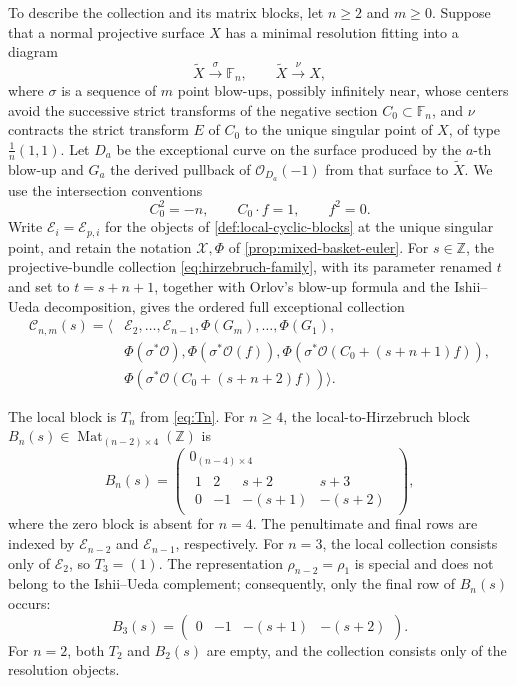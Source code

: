 \documentclass[11pt]{article}
\theoremstyle{plain}
\theoremstyle{definition}
\theoremstyle{remark}
\newcommand{\F}{\mathbb F}
\newcommand{\Z}{\mathbb Z}
\newcommand{\XX}{\mathcal X}
\newcommand{\OO}{\mathcal O}
\begin{document}
To describe the collection and its matrix blocks, let \(n\geq2\) and
\(m\geq0\). Suppose that a normal projective surface \(X\) has
a minimal resolution fitting into a diagram
\[
\widetilde X\xrightarrow{\ \sigma\ }\F_n,
\qquad
\widetilde X\xrightarrow{\ \nu\ }X,
\]
where \(\sigma\) is a sequence of \(m\) point blow-ups, possibly
infinitely near, whose centers avoid the successive strict transforms
of the negative section \(C_0\subset\F_n\), and \(\nu\)
contracts the strict transform \(E\) of \(C_0\) to the unique singular point
of \(X\), of type \(\frac1n(1,1)\). Let \(D_a\) be the exceptional
curve on the surface produced by the \(a\)-th blow-up and \(G_a\) the derived
pullback of \(\OO_{D_a}(-1)\) from that surface to \(\widetilde X\). We use the
intersection conventions
\[
C_0^2=-n,
\qquad
C_0\cdot f=1,
\qquad
f^2=0.
\]
Write \(\mathcal E_i=\mathcal E_{p,i}\) for the objects of
\cref{def:local-cyclic-blocks} at the unique singular point, and
retain the notation \(\XX,\Phi\) of \cref{prop:mixed-basket-euler}.
For \(s\in\Z\), the projective-bundle collection
\eqref{eq:hirzebruch-family}, with its parameter renamed \(t\) and set to
\(t=s+n+1\), together with Orlov's blow-up formula and the Ishii--Ueda
decomposition, gives the ordered full exceptional collection
\[
\begin{aligned}
\mathcal C_{n,m}(s)=\big\langle
&\mathcal E_2,\dots,\mathcal E_{n-1},
\Phi(G_m),\dots,\Phi(G_1),\\
&\Phi(\sigma^*\OO),\Phi(\sigma^*\OO(f)),
\Phi(\sigma^*\OO(C_0+(s+n+1)f)),\\
&\Phi(\sigma^*\OO(C_0+(s+n+2)f))
\big\rangle .
\end{aligned}
\]

The local block is \(T_n\) from \eqref{eq:Tn}.
For \(n\geq4\), the local-to-Hirzebruch block
\(B_n(s)\in\operatorname{Mat}_{(n-2)\times4}(\Z)\) is
\begin{equation}\label{eq:Bn}
B_n(s)
=
\begin{pmatrix}
0_{(n-4)\times4}\\[2pt]
\begin{matrix}
1&2&s+2&s+3\\
0&-1&-(s+1)&-(s+2)
\end{matrix}
\end{pmatrix},
\end{equation}
where the zero block is absent for \(n=4\). The penultimate and final rows
are indexed by \(\mathcal E_{n-2}\) and \(\mathcal E_{n-1}\), respectively.
For \(n=3\), the local collection consists only of \(\mathcal E_2\), so
\(T_3=(1)\). The representation \(\rho_{n-2}=\rho_1\) is special and does
not belong to the Ishii--Ueda complement; consequently, only the final row
of \(B_n(s)\) occurs:
\[
B_3(s)
=
\begin{pmatrix}
0&-1&-(s+1)&-(s+2)
\end{pmatrix}.
\]
For \(n=2\), both \(T_2\) and \(B_2(s)\) are empty, and the
collection consists only of the resolution objects.
\end{document}
